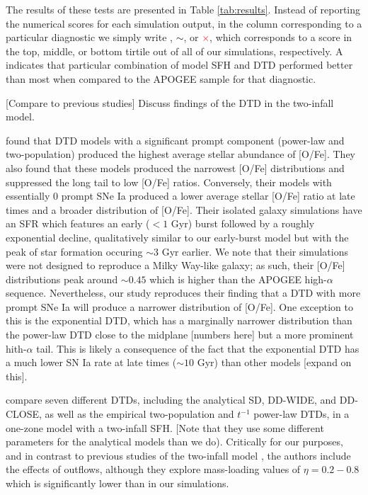 \documentclass[twocolumn,twocolappendix,linenumbers,trackchanges]{aastex631}
\newcommand{\yes}{\textcolor{green}{\checkmark}}
\newcommand{\meh}{\textcolor{black}{$\sim$}}
\newcommand{\no}{\textcolor{red}{$\times$}}
\begin{document}
The results of these tests are presented in Table \ref{tab:results}. Instead of reporting the numerical scores for each simulation output, in the column corresponding to a particular diagnostic we simply write \yes, \meh, or \no, which corresponds to a score in the top, middle, or bottom tirtile out of all of our simulations, respectively. A \yes indicates that particular combination of model SFH and DTD performed better than most when compared to the APOGEE sample for that diagnostic.


[Compare to previous studies]
Discuss \citet{Matteucci2006-BimodalDTDConsequences} findings of the \citet{Mannucci2006-TwoPopulations} DTD in the two-infall model.

\citet{Poulhazan2018-PrecisionPollution} found that DTD models with a significant prompt component (power-law and two-population) produced the highest average stellar abundance of [O/Fe]. They also found that these models produced the narrowest [O/Fe] distributions and suppressed the long tail to low [O/Fe] ratios. Conversely, their models with essentially 0 prompt SNe Ia produced a lower average stellar [O/Fe] ratio at late times and a broader distribution of [O/Fe]. Their isolated galaxy simulations have an SFR which features an early ($<1$ Gyr) burst followed by a roughly exponential decline, qualitatively similar to our early-burst model but with the peak of star formation occuring $\sim3$ Gyr earlier. We note that their simulations were not designed to reproduce a Milky Way-like galaxy; as such, their [O/Fe] distributions peak around $\sim0.45$ which is higher than the APOGEE high-$\alpha$ sequence. Nevertheless, our study reproduces their finding that a DTD with more prompt SNe Ia will produce a narrower distribution of [O/Fe]. One exception to this is the exponential DTD, which has a marginally narrower distribution than the power-law DTD close to the midplane [numbers here] but a more prominent hith-$\alpha$ tail. This is likely a consequence of the fact that the exponential DTD has a much lower SN Ia rate at late times ($\sim10$ Gyr) than other models [expand on this].

\citet{Palicio2023-AnalyticDTD} compare seven different DTDs, including the analytical SD, DD-WIDE, and DD-CLOSE, as well as the empirical two-population and $t^{-1}$ power-law DTDs, in a one-zone model with a two-infall SFH. [Note that they use some different parameters for the analytical models than we do). Critically for our purposes, and in contrast to previous studies of the two-infall model \citep[e.g.,][others]{Chiappini1997-TwoInfall,Spitoni2021-TwoInfall}, the authors include the effects of outflows, although they explore mass-loading values of $\eta=0.2-0.8$ which is significantly lower than in our simulations.
\end{document}
